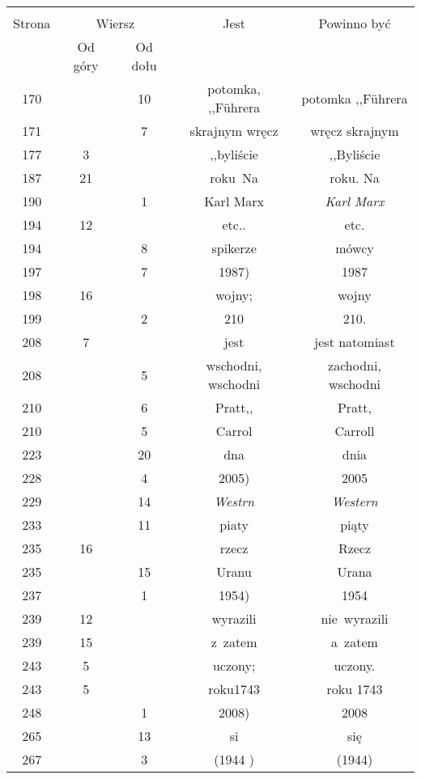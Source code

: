 \documentclass[a4paper,11pt]{article}
\begin{document}
\begin{center}
  \begin{tabular}{|c|c|c|c|c|}
    \hline
    & \multicolumn{2}{c|}{} & & \\
    Strona & \multicolumn{2}{c|}{Wiersz} & Jest
                              & Powinno być \\ \cline{2-3}
    & Od góry & Od dołu & & \\
    \hline
    170 & & 10 & potomka, ,,F\"{u}hrera  %
           & potomka ,,F\"{u}hrera  %
    \\
    171 & &  7 & skrajnym wręcz & wręcz skrajnym \\
    177 &  3 & & ,,byliście & ,,Byliście \\
    187 & 21 & & roku~Na & roku. Na \\
    190 & &  1 & Karl Marx & \emph{Karl Marx} \\
    194 & 12 & & etc.. & etc. \\
    194 & &  8 & spikerze & mówcy \\
    197 & &  7 & 1987) & 1987 \\
    198 & 16 & & wojny; & wojny \\
    199 & &  2 & 210 & 210. \\
    208 &  7 & & jest & jest natomiast \\
    208 & &  5 & wschodni, wschodni & zachodni, wschodni \\
    210 & &  6 & Pratt,, & Pratt, \\
    210 & &  5 & Carrol & Carroll \\
    223 & & 20 & dna & dnia \\
    228 & &  4 & 2005) & 2005 \\
    229 & & 14 & \emph{Westrn} & \emph{Western} \\
    233 & & 11 & piaty & piąty \\
    235 & 16 & & rzecz & Rzecz \\
    235 & & 15 & Uranu & Urana \\
    237 & &  1 & 1954) & 1954 \\
    239 & 12 & & wyrazili & nie~wyrazili \\
    239 & 15 & & z~zatem & a~zatem \\
    243 &  5 & & uczony; & uczony. \\
    243 &  5 & & roku1743 & roku 1743 \\
    248 & &  1 & 2008) & 2008 \\
    265 & & 13 & si & się \\
    267 & &  3 & (1944 ) & (1944) \\

\end{tabular}
\end{center}
\end{document}
